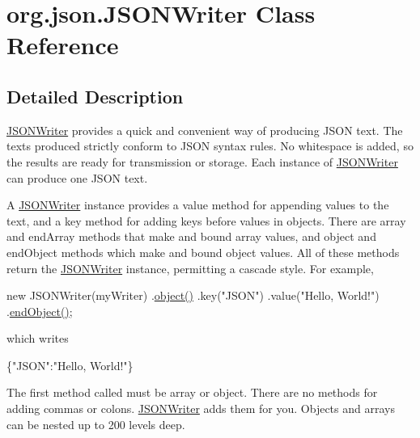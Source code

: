 \hypertarget{classorg_1_1json_1_1JSONWriter}{\section{org.\-json.\-J\-S\-O\-N\-Writer Class Reference}
\label{classorg_1_1json_1_1JSONWriter}
}


\subsection{Detailed Description}
\hyperlink{classorg_1_1json_1_1JSONWriter}{J\-S\-O\-N\-Writer} provides a quick and convenient way of producing J\-S\-O\-N text. The texts produced strictly conform to J\-S\-O\-N syntax rules. No whitespace is added, so the results are ready for transmission or storage. Each instance of \hyperlink{classorg_1_1json_1_1JSONWriter}{J\-S\-O\-N\-Writer} can produce one J\-S\-O\-N text. 

A \hyperlink{classorg_1_1json_1_1JSONWriter}{J\-S\-O\-N\-Writer} instance provides a {\ttfamily value} method for appending values to the text, and a {\ttfamily key} method for adding keys before values in objects. There are {\ttfamily array} and {\ttfamily end\-Array} methods that make and bound array values, and {\ttfamily object} and {\ttfamily end\-Object} methods which make and bound object values. All of these methods return the \hyperlink{classorg_1_1json_1_1JSONWriter}{J\-S\-O\-N\-Writer} instance, permitting a cascade style. For example, 
\begin{DoxyPre}
new JSONWriter(myWriter)
    .\hyperlink{classorg_1_1json_1_1JSONWriter_a50ed212b9c8c9f6a57c3ddfc6bf3126a}{object()}
        .key("JSON")
        .value("Hello, World!")
    .\hyperlink{classorg_1_1json_1_1JSONWriter_a25cc931ef86998c61f08b1d5eff22146}{endObject()};\end{DoxyPre}
 which writes 
\begin{DoxyPre}
\{"JSON":"Hello, World!"\}\end{DoxyPre}
 

The first method called must be {\ttfamily array} or {\ttfamily object}. There are no methods for adding commas or colons. \hyperlink{classorg_1_1json_1_1JSONWriter}{J\-S\-O\-N\-Writer} adds them for you. Objects and arrays can be nested up to 200 levels deep. 

